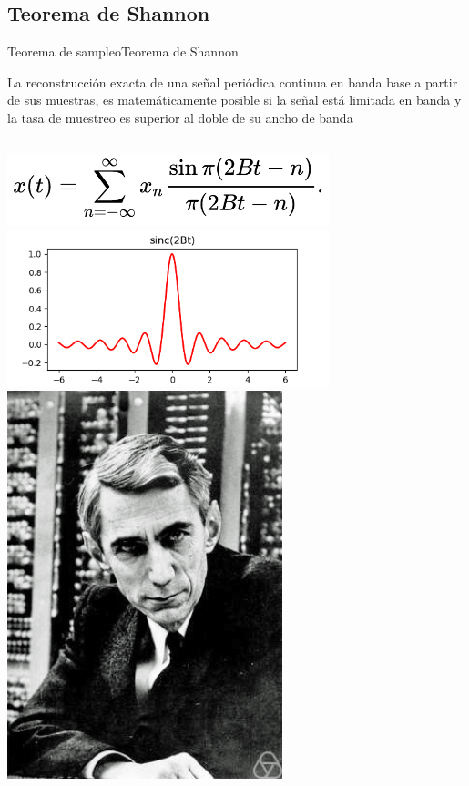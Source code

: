       \subsection{Teorema de Shannon}
      \begin{frame}{Teorema de sampleo}{Teorema de Shannon}
         \begin{teorema}
          La reconstrucción exacta de una señal periódica continua en banda base a partir de sus muestras, es matemáticamente posible si la señal está limitada en banda y la tasa de muestreo es superior al doble de su ancho de banda
         \end{teorema}
         \begin{columns}[onlytextwidth]
            \center\includegraphics[width=0.7\textwidth]{1_clase/shannon} \\
            \center\includegraphics[width=0.7\textwidth]{1_clase/sinc_limpia}
            \center\includegraphics[width=0.6\textwidth]{1_clase/claude_shannon}
         \end{columns}
         \vfill
      \end{frame}
